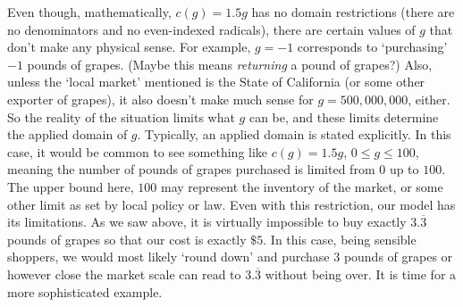 Even though, mathematically, $c(g) = 1.5g$ has no domain restrictions (there are no denominators and no even-indexed radicals), there are certain values of $g$ that don't make any physical sense.  For example, $g = -1$ corresponds to `purchasing' $-1$ pounds of grapes. (Maybe this means \textit{returning} a pound of grapes?)  Also, unless the `local market' mentioned is the State of California (or some other exporter of grapes), it also doesn't make much sense for $g = 500,\!000,\!000$, either. So the reality of the situation limits what $g$ can be, and these limits determine the applied domain of $g$.  Typically, an applied domain is stated explicitly.  In this case, it would be common to see something like $c(g) = 1.5g$, $0 \leq g \leq 100$, meaning the number of pounds of grapes purchased is limited from $0$ up to $100$. The upper bound here, $100$ may represent the inventory of the market, or some other limit as set by local policy or law.  Even with this restriction, our model has its limitations.  As we saw above, it is virtually impossible to buy exactly  $3.\overline{3}$ pounds of grapes so that our cost is exactly $\$5$.  In this case, being sensible shoppers, we would most likely `round down' and purchase $3$ pounds of grapes or however close the market scale can read to $3.\overline{3}$ without being over.  It is time for a more sophisticated example.

\medskip

